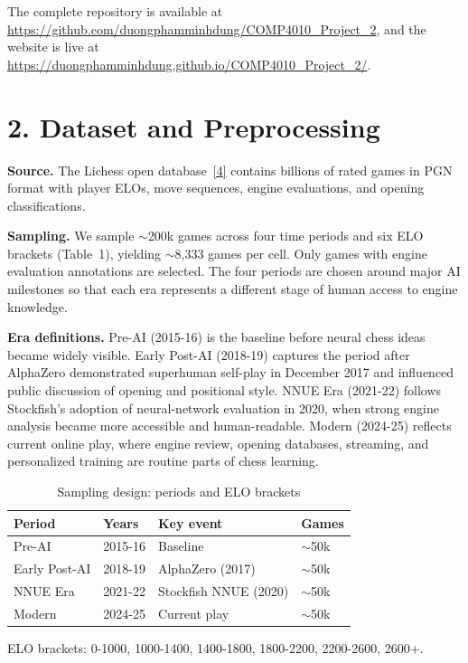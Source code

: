 \documentclass[a4paper]{article}
\begin{document}
The complete repository is available at \url{https://github.com/duongphamminhdung/COMP4010_Project_2}, and the website is live at \url{https://duongphamminhdung.github.io/COMP4010_Project_2/}.


\section*{2. Dataset and Preprocessing}

\textbf{Source.}
The Lichess open database~\hyperlink{ref4}{[4]} contains billions of rated games in PGN format with player ELOs, move sequences, engine evaluations, and opening classifications.

\textbf{Sampling.}
We sample $\sim$200k games across four time periods and six ELO brackets (Table~1), yielding $\sim$8,333 games per cell. Only games with engine evaluation annotations are selected. The four periods are chosen around major AI milestones so that each era represents a different stage of human access to engine knowledge.

\textbf{Era definitions.}
Pre-AI (2015-16) is the baseline before neural chess ideas became widely visible. Early Post-AI (2018-19) captures the period after AlphaZero demonstrated superhuman self-play in December 2017 and influenced public discussion of opening and positional style. NNUE Era (2021-22) follows Stockfish's adoption of neural-network evaluation in 2020, when strong engine analysis became more accessible and human-readable. Modern (2024-25) reflects current online play, where engine review, opening databases, streaming, and personalized training are routine parts of chess learning.

\begin{table}[h]
\centering
\caption{Sampling design: periods and ELO brackets}
\label{tab:sampling}
\begin{tabular}{llll}
\hline
\textbf{Period} & \textbf{Years} & \textbf{Key event} & \textbf{Games} \\
\hline
Pre-AI            & 2015-16 & Baseline            & $\sim$50k \\
Early Post-AI     & 2018-19 & AlphaZero (2017)    & $\sim$50k \\
NNUE Era          & 2021-22 & Stockfish NNUE (2020) & $\sim$50k \\
Modern            & 2024-25 & Current play        & $\sim$50k \\
\hline
\end{tabular}

\vspace{0.3em}
\small ELO brackets: 0-1000, 1000-1400, 1400-1800, 1800-2200, 2200-2600, 2600+.
\end{table}
\end{document}
